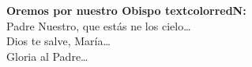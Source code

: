 \textbf{Oremos por nuestro Obispo textcolor{red}{N}:}\\
Padre Nuestro, que estás ne los cielo\ldots\\
Dios te salve, María\ldots\\
Gloria al Padre\ldots